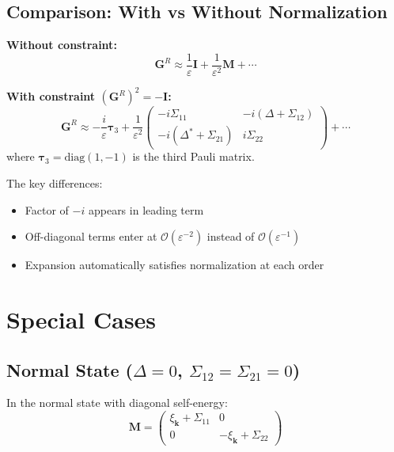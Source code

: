 \documentclass[12pt]{article}
\begin{document}
\subsection{Comparison: With vs Without Normalization}

\textbf{Without constraint:}
\begin{equation}
\mathbf{G}^R \approx \frac{1}{\varepsilon}\mathbf{I} + \frac{1}{\varepsilon^2}\mathbf{M} + \cdots
\end{equation}

\textbf{With constraint $(\mathbf{G}^R)^2 = -\mathbf{I}$:}
\begin{equation}
\mathbf{G}^R \approx -\frac{i}{\varepsilon}\boldsymbol{\tau}_3 + \frac{1}{\varepsilon^2}\begin{pmatrix}
-i\Sigma_{11} & -i(\Delta + \Sigma_{12}) \\
-i(\Delta^* + \Sigma_{21}) & i\Sigma_{22}
\end{pmatrix} + \cdots
\end{equation}
where $\boldsymbol{\tau}_3 = \text{diag}(1, -1)$ is the third Pauli matrix.

The key differences:
\begin{itemize}
\item Factor of $-i$ appears in leading term
\item Off-diagonal terms enter at $\mathcal{O}(\varepsilon^{-2})$ instead of $\mathcal{O}(\varepsilon^{-1})$
\item Expansion automatically satisfies normalization at each order
\end{itemize}

\section{Special Cases}

\subsection{Normal State ($\Delta = 0$, $\Sigma_{12} = \Sigma_{21} = 0$)}

In the normal state with diagonal self-energy:
\begin{equation}
\mathbf{M} = \begin{pmatrix}
\xi_{\mathbf{k}} + \Sigma_{11} & 0 \\
0 & -\xi_{\mathbf{k}} + \Sigma_{22}
\end{pmatrix}
\end{equation}
\end{document}
